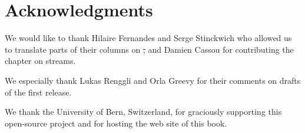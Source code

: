 \documentclass[a4paper,10pt,twoside]{book}
\begin{document}







\section*{Acknowledgments}

We would like to thank Hilaire Fernandes and Serge Stinckwich who allowed us to translate parts of their columns on \st, and Damien Cassou for contributing the chapter on streams.

We especially thank Lukas Renggli and Orla Greevy for their comments on drafts of the first release.

We thank the University of Bern, Switzerland, for graciously supporting this open-source project and for hosting the web site of this book.
\end{document}
